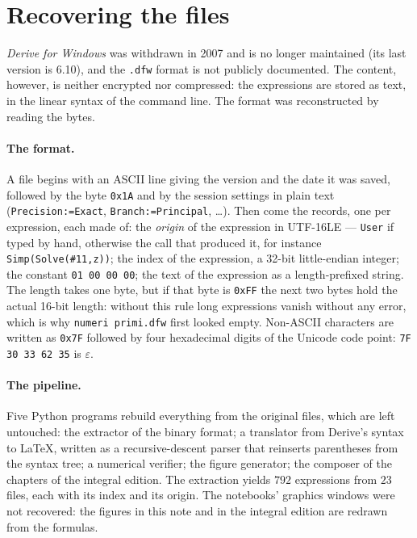 \section{Recovering the files}
\label{app:recupero}

\emph{Derive for Windows} was withdrawn in 2007 and is no longer maintained
(its last version is 6.10), and the \texttt{.dfw} format is not publicly
documented. The content, however, is neither encrypted nor
compressed: the expressions are stored as text, in the linear syntax of the
command line. The format was reconstructed by reading the bytes.

\paragraph{The format.}
A file begins with an ASCII line giving the version and the date it was
saved, followed by the byte \texttt{0x1A} and by the session settings in
plain text (\texttt{Precision:=Exact}, \texttt{Branch:=Principal}, \dots).
Then come the records, one per expression, each made of: the \emph{origin} of
the expression in UTF-16LE --- \texttt{User} if typed by hand, otherwise the
call that produced it, for instance \texttt{Simp(Solve(\#11,z))}; the index
of the expression, a 32-bit little-endian integer; the constant
\texttt{01 00 00 00}; the text of the expression as a length-prefixed string.
The length takes one byte, but if that byte is \texttt{0xFF} the next two
bytes hold the actual 16-bit length: without this rule long expressions
vanish without any error, which is why \texttt{numeri primi.dfw} first looked
empty. Non-ASCII characters are written as \texttt{0x7F} followed by four
hexadecimal digits of the Unicode code point: \texttt{7F 30 33 62 35} is
$\varepsilon$.

\paragraph{The pipeline.}
Five Python programs rebuild everything from the original files, which are
left untouched: the extractor of the binary format; a translator from
Derive's syntax to \LaTeX, written as a recursive-descent parser that
reinserts parentheses from the syntax tree; a numerical verifier; the figure
generator; the composer of the chapters of the integral edition. The extraction yields $792$ expressions from $23$ files, each with
its index and its origin. The notebooks' graphics windows were not recovered:
the figures in this note and in the integral edition are redrawn from the
formulas.

